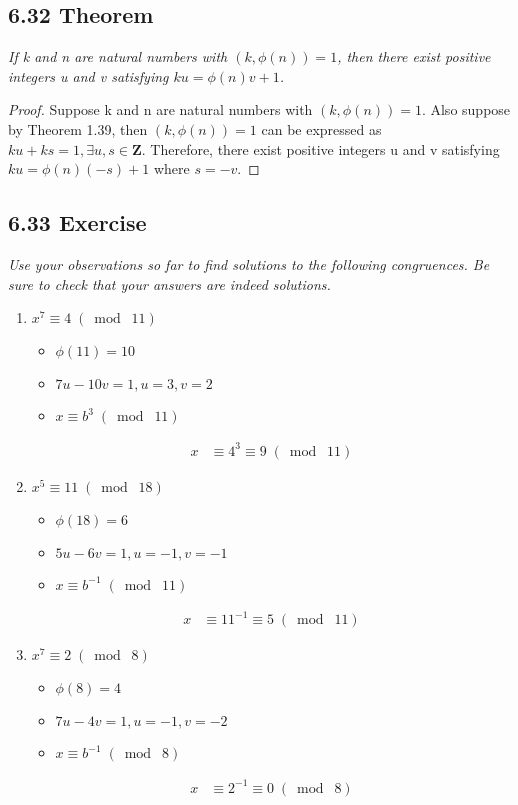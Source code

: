 \documentclass{article}
\begin{document}
\subsection*{6.32 Theorem} 
\quad \textit{If k and n are natural numbers with $(k,\phi(n))=1$, then there exist positive integers u and v satisfying $ku = \phi(n)v+1$.}

\begin{proof}
Suppose k and n are natural numbers with $(k,\phi(n))=1$. Also suppose by Theorem 1.39, then $(k,\phi(n))=1$ can be expressed as $ku + ks = 1, \exists u,s \in \mathbf{Z}$. Therefore, there exist positive integers u and v satisfying $ku = \phi(n)(-s)+1$ where $s = -v$.
\end{proof}

\subsection*{6.33 Exercise} 
\quad \textit{Use your observations so far to find solutions to the following congruences. Be sure to check that your answers are indeed solutions.}
\begin{enumerate}
    \item $x^7 \equiv 4 \;(\bmod\; 11)$
    \begin{itemize}
        \item $\phi(11) = 10$
        \item $7u - 10v = 1, u = 3, v = 2$
        \item $ x \equiv b^3 \;(\bmod\; 11)$
    \end{itemize}
    \begin{align*}
        &&x &\equiv 4^3 \equiv 9 \;(\bmod\; 11)&&
    \end{align*}
    \item $x^5 \equiv 11 \;(\bmod\; 18)$
    \begin{itemize}
        \item $\phi(18) = 6$
        \item $5u - 6v = 1, u = -1, v = -1$
        \item $ x \equiv b^{-1} \;(\bmod\; 11)$
    \end{itemize}
    \begin{align*}
        &&x &\equiv 11^{-1} \equiv 5 \;(\bmod\; 11)&&
    \end{align*}
    \item $x^7 \equiv 2 \;(\bmod\; 8)$
    \begin{itemize}
        \item $\phi(8) = 4$
        \item $7u - 4v = 1, u = -1, v = -2$
        \item $x \equiv b^{-1} \;(\bmod\; 8)$
    \end{itemize}
    \begin{align*}
        &&x &\equiv 2^{-1} \equiv 0 \;(\bmod\; 8)&&
    \end{align*}
\end{enumerate}
\end{document}
